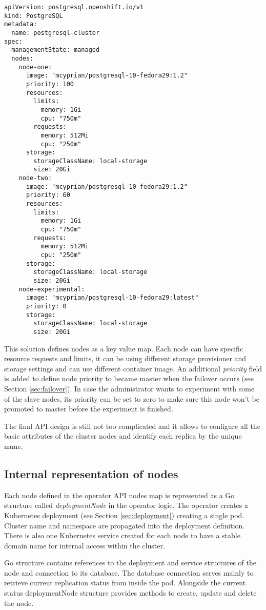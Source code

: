 \documentclass[
  digital, %
  twoside, %
  table,   %
  lof,     %
  lot,     %
]{fithesis3}
\begin{document}
\begin{lstlisting}
apiVersion: postgresql.openshift.io/v1
kind: PostgreSQL
metadata:
  name: postgresql-cluster
spec:
  managementState: managed
  nodes:
    node-one:
      image: "mcyprian/postgresql-10-fedora29:1.2"
      priority: 100
      resources:
        limits:
          memory: 1Gi
          cpu: "750m"
        requests:
          memory: 512Mi
          cpu: "250m"
      storage:
        storageClassName: local-storage
        size: 20Gi
    node-two:
      image: "mcyprian/postgresql-10-fedora29:1.2"
      priority: 60
      resources:
        limits:
          memory: 1Gi
          cpu: "750m"
        requests:
          memory: 512Mi
          cpu: "250m"
      storage:
        storageClassName: local-storage
        size: 20Gi
    node-experimental:
      image: "mcyprian/postgresql-10-fedora29:latest"
      priority: 0
      storage:
        storageClassName: local-storage
        size: 20Gi
\end{lstlisting}

This solution defines nodes as a key value map. Each node can have specific resource requests and limits, it can be using different storage provisioner and storage settings and can use different container image. An additional \textit{priority} field is added to define node priority to became master when the failover occurs (see Section \ref{sec:failover}). In case the administrator wants to experiment with some of the slave nodes, its priority can be set to zero to make sure this node won't be promoted to master before the experiment is finished.

The final API design is still not too complicated and it allows to configure all the basic attributes of the cluster nodes and identify each replica by the unique name.

\subsection{Internal representation of nodes}
 Each node defined in the operator API nodes map is represented as a Go structure called \textit{deploymentNode} in the operator logic. The operator creates a Kubernetes deployment (see Section \ref{sec:deployment}) creating a single pod. Cluster name and namespace are propagated into the deployment definition. There is also one Kubernetes service created for each node to have a stable domain name for internal access within the cluster.

 Go structure contains references to the deployment and service structures of the node and connection to its database. The database connection serves mainly to retrieve current replication status from inside the pod. Alongside the current status deploymentNode structure provides methods to create, update and delete the node.
\end{document}
